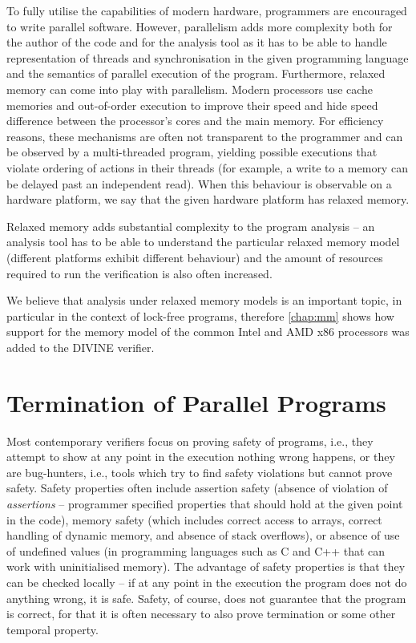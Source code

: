 To fully utilise the capabilities of modern hardware, programmers are encouraged to write parallel software.
However, parallelism adds more complexity both for the author of the code and for the analysis tool as it has to be able to handle representation of threads and synchronisation in the given programming language and the semantics of parallel execution of the program.
Furthermore, relaxed memory can come into play with parallelism.
Modern processors use cache memories and out-of-order execution to improve their speed and hide speed difference between the processor's cores and the main memory.
For efficiency reasons, these mechanisms are often not transparent to the programmer and can be observed by a multi-threaded program, yielding possible executions that violate ordering of actions in their threads (for example, a write to a memory can be delayed past an independent read).
When this behaviour is observable on a hardware platform, we say that the given hardware platform has relaxed memory.

Relaxed memory adds substantial complexity to the program analysis --
an analysis tool has to be able to understand the particular relaxed memory model (different platforms exhibit different behaviour) and the amount of resources required to run the verification is also often increased.

We believe that analysis under relaxed memory models is an important topic,
in particular in the context of lock-free programs, therefore \autoref{chap:mm}
shows how support for the memory model of the common Intel and AMD x86
processors was added to the DIVINE verifier.

\section{Termination of Parallel Programs}

Most contemporary verifiers focus on proving safety of programs, i.e., they
attempt to show at any point in the execution nothing wrong happens, or they are bug-hunters, i.e., tools which try to find safety violations but cannot prove safety.
Safety properties often include assertion safety (absence of violation of \emph{assertions} -- programmer specified properties that should hold at the given point in the code), memory safety (which includes correct access to arrays, correct handling of dynamic memory, and absence of stack overflows), or absence of use of undefined values (in programming languages such as C and C++ that can work with uninitialised memory).
The advantage of safety properties is that they can be checked locally -- if at
any point in the execution the program does not do anything wrong, it is safe.
Safety, of course, does not guarantee that the program is correct, for that it is often necessary to also prove termination or some other temporal property.

